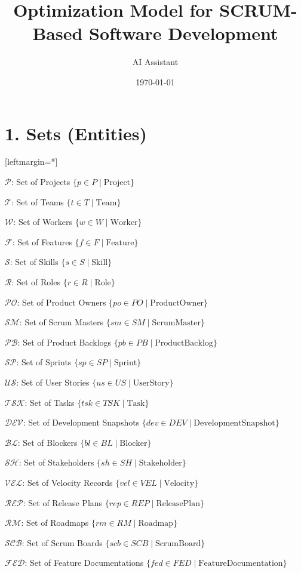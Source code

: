 \documentclass[12pt]{article}
\title{Optimization Model for SCRUM-Based Software Development}
\author{AI Assistant}
\date{\today}
\begin{document}
\maketitle
\tableofcontents
\newpage

\section{1. Sets (Entities)}
[leftmargin=*]
    \item $ \mathcal{P} $: Set of Projects $ \{ p \in P \mid \text{Project} \} $
    \item $ \mathcal{T} $: Set of Teams $ \{ t \in T \mid \text{Team} \} $
    \item $ \mathcal{W} $: Set of Workers $ \{ w \in W \mid \text{Worker} \} $
    \item $ \mathcal{F} $: Set of Features $ \{ f \in F \mid \text{Feature} \} $
    \item $ \mathcal{S} $: Set of Skills $ \{ s \in S \mid \text{Skill} \} $
    \item $ \mathcal{R} $: Set of Roles $ \{ r \in R \mid \text{Role} \} $
    \item $ \mathcal{PO} $: Set of Product Owners $ \{ po \in PO \mid \text{ProductOwner} \} $
    \item $ \mathcal{SM} $: Set of Scrum Masters $ \{ sm \in SM \mid \text{ScrumMaster} \} $
    \item $ \mathcal{PB} $: Set of Product Backlogs $ \{ pb \in PB \mid \text{ProductBacklog} \} $
    \item $ \mathcal{SP} $: Set of Sprints $ \{ sp \in SP \mid \text{Sprint} \} $
    \item $ \mathcal{US} $: Set of User Stories $ \{ us \in US \mid \text{UserStory} \} $
    \item $ \mathcal{TSK} $: Set of Tasks $ \{ tsk \in TSK \mid \text{Task} \} $
    \item $ \mathcal{DEV} $: Set of Development Snapshots $ \{ dev \in DEV \mid \text{DevelopmentSnapshot} \} $
    \item $ \mathcal{BL} $: Set of Blockers $ \{ bl \in BL \mid \text{Blocker} \} $
    \item $ \mathcal{SH} $: Set of Stakeholders $ \{ sh \in SH \mid \text{Stakeholder} \} $
    \item $ \mathcal{VEL} $: Set of Velocity Records $ \{ vel \in VEL \mid \text{Velocity} \} $
    \item $ \mathcal{REP} $: Set of Release Plans $ \{ rep \in REP \mid \text{ReleasePlan} \} $
    \item $ \mathcal{RM} $: Set of Roadmaps $ \{ rm \in RM \mid \text{Roadmap} \} $
    \item $ \mathcal{SCB} $: Set of Scrum Boards $ \{ scb \in SCB \mid \text{ScrumBoard} \} $
    \item $ \mathcal{FED} $: Set of Feature Documentations $ \{ fed \in FED \mid \text{FeatureDocumentation} \} $
\end{document}
